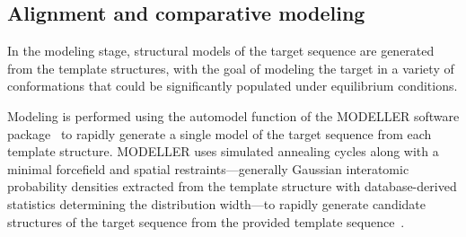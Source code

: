 \documentclass[aps,pre,twocolumn,nofootinbib,superscriptaddress,linenumbers]{revtex4-1}
\begin{document}

\subsection{Alignment and comparative modeling}

In the modeling stage, structural models of the target sequence are generated from the template structures, with the goal of modeling the target in a variety of conformations that could be significantly populated under equilibrium conditions.

Modeling is performed using the automodel function of the MODELLER software package~\cite{fiser:prot-sci:2000:modeller,sali:jmb:1993:modeller} to rapidly generate a single model of the target sequence from each template structure.
MODELLER uses simulated annealing cycles along with a minimal forcefield and spatial restraints---generally Gaussian interatomic probability densities extracted from the template structure with database-derived statistics determining the distribution width---to rapidly generate candidate structures of the target sequence from the provided template sequence~\cite{fiser:prot-sci:2000:modeller,sali:jmb:1993:modeller}.
\end{document}
